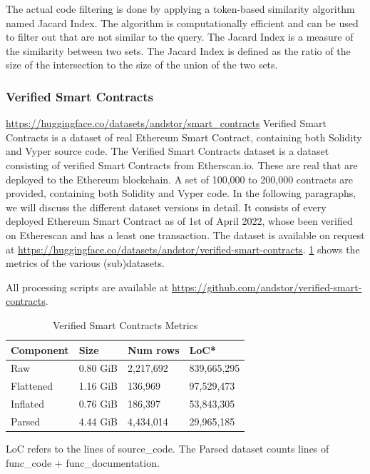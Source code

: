 The actual code filtering is done by applying a token-based similarity algorithm named Jacard Index. The algorithm is computationally efficient and can be used to filter out  that are not similar to the query. The Jacard Index is a measure of the similarity between two sets. The Jacard Index is defined as the ratio of the size of the intersection to the size of the union of the two sets.

\subsubsection{Verified Smart Contracts}
\label{sec:verified-smart-contracts}

\url{https://huggingface.co/datasets/andstor/smart_contracts}
Verified Smart Contracts is a dataset of real Ethereum Smart Contract, containing both Solidity and Vyper source code. 
The Verified Smart Contracts dataset is a dataset consisting of verified Smart Contracts from Etherscan.io. These are real  that are deployed to the Ethereum blockchain. A set of 100,000 to 200,000 contracts are provided, containing both Solidity and Vyper code. In the following paragraphs, we will discuss the different dataset versions in detail. It consists of every deployed Ethereum Smart Contract as of 1st of April 2022, whose been verified on Etherescan and has a least one transaction. The dataset is available on request at \url{https://huggingface.co/datasets/andstor/verified-smart-contracts}. \cref{tab:verified-smart-contracts-metrics} shows the metrics of the various (sub)datasets.


All processing scripts are available at \url{https://github.com/andstor/verified-smart-contracts}.

\begin{table}
    \def\arraystretch{1.5}
    \small
    \centering
    \caption{Verified Smart Contracts Metrics}
    \label{tab:verified-smart-contracts-metrics}
    \begin{tabularx}{\textwidth}{XXXX}
        \toprule
        \textbf{Component} & \textbf{Size} &  \textbf{Num rows} & \textbf{LoC*}\\
        \midrule
        Raw & 0.80 GiB & 2,217,692 & 839,665,295\\
        Flattened & 1.16 GiB & 136,969 & 97,529,473\\
        Inflated & 0.76 GiB & 186,397 & 53,843,305\\
        Parsed & 4.44 GiB & 4,434,014 & 29,965,185\\
        \bottomrule
    \end{tabularx}
\end{table}
LoC refers to the lines of source\_code. The Parsed dataset counts lines of func\_code + func\_documentation.

